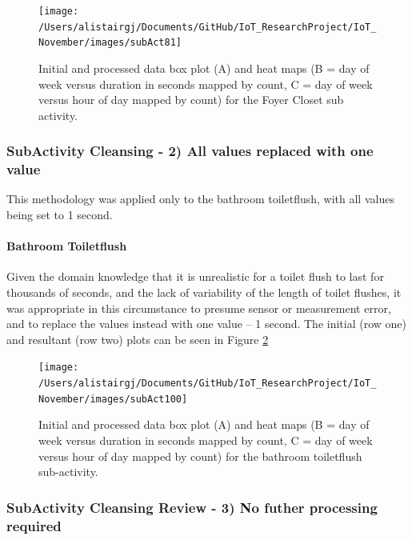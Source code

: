 \documentclass[11pt,]{article}
\let\oldparagraph\paragraph
\renewcommand{\paragraph}[1]{\oldparagraph{#1}\mbox{}}
\begin{document}
\begin{figure}[H]

{\centering \texttt{[image: /Users/alistairgj/Documents/GitHub/IoT\_ResearchProject/IoT\_November/images/subAct81]} 

}

\caption{Initial and processed data box plot (A) and heat maps (B = day of week versus duration in seconds mapped by count, C = day of week versus hour of day mapped by count) for the Foyer Closet sub activity.}\label{fig:subAct81}
\end{figure}

\hypertarget{subactivity-cleansing---2-all-values-replaced-with-one-value}{%
\subsubsection{SubActivity Cleansing - 2) All values replaced with one
value}\label{subactivity-cleansing---2-all-values-replaced-with-one-value}}

This methodology was applied only to the bathroom toiletflush, with all
values being set to 1 second.

\hypertarget{bathroom-toiletflush}{%
\paragraph{Bathroom Toiletflush}\label{bathroom-toiletflush}}

Given the domain knowledge that it is unrealistic for a toilet flush to
last for thousands of seconds, and the lack of variability of the length
of toilet flushes, it was appropriate in this circumstance to presume
sensor or measurement error, and to replace the values instead with one
value -- 1 second. The initial (row one) and resultant (row two) plots
can be seen in Figure \ref{fig:subAct100}

\begin{figure}[H]

{\centering \texttt{[image: /Users/alistairgj/Documents/GitHub/IoT\_ResearchProject/IoT\_November/images/subAct100]} 

}

\caption{Initial and processed data box plot (A) and heat maps (B = day of week versus duration in seconds mapped by count, C = day of week versus hour of day mapped by count) for the bathroom toiletflush sub-activity.}\label{fig:subAct100}
\end{figure}

\hypertarget{subactivity-cleansing-review---3-no-futher-processing-required}{%
\subsubsection{SubActivity Cleansing Review - 3) No futher processing
required}\label{subactivity-cleansing-review---3-no-futher-processing-required}}
\end{document}
